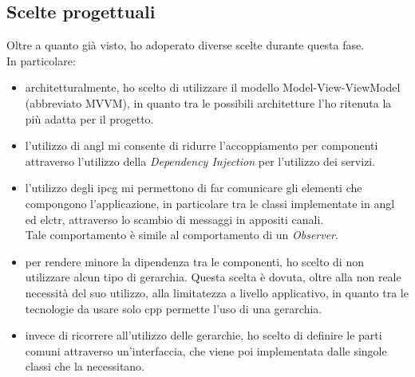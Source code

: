 \subsection{Scelte progettuali}
Oltre a quanto già visto, ho adoperato diverse scelte durante questa fase.\\
In particolare:
\begin{itemize}
    \item architetturalmente, ho scelto di utilizzare il modello Model-View-ViewModel (abbreviato MVVM), in quanto tra le possibili architetture l'ho ritenuta la più adatta per il progetto.
    \item l'utilizzo di \Gls{angl} mi consente di ridurre l'accoppiamento per componenti attraverso l'utilizzo della \emph{Dependency Injection} per l'utilizzo dei servizi.
    \item l'utilizzo degli \Gls{ipcg} mi permettono di far comunicare gli elementi che compongono l'applicazione, in particolare tra le classi implementate in \Gls{angl} ed \Gls{elctr}, attraverso lo scambio di messaggi in appositi canali.\\Tale comportamento è simile al comportamento di un \emph{Observer}.
    \item per rendere minore la dipendenza tra le componenti, ho scelto di non utilizzare alcun tipo di gerarchia. Questa scelta è dovuta, oltre alla non reale necessità del suo utilizzo, alla limitatezza a livello applicativo, in quanto tra le tecnologie da usare solo \gls{cpp} permette l'uso di una gerarchia.
    \item invece di ricorrere all'utilizzo delle gerarchie, ho scelto di definire le parti comuni attraverso un'interfaccia, che viene poi implementata dalle singole classi che la necessitano.
\end{itemize}